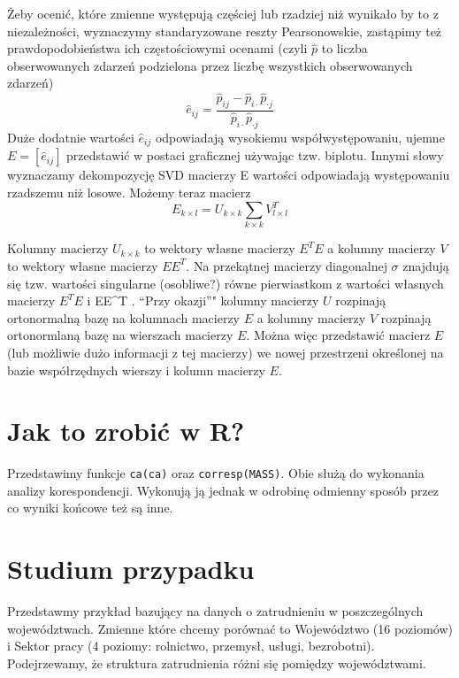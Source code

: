 \documentclass[polish,]{book}
\begin{document}
Żeby ocenić, które zmienne występują częściej lub rzadziej niż wynikało by to
z niezależności, wyznaczymy standaryzowane reszty Pearsonowskie, zastąpimy też
prawdopodobieństwa ich częstościowymi ocenami (czyli \(\hat{p}\)
to liczba obserwowanych
zdarzeń podzielona przez liczbę wszystkich obserwowanych zdarzeń)
\[
\hat{e}_{ij}=\frac{\hat{p}_{ij}-\hat{p}_{i\cdot}\hat{p}_{\cdot j}}{\hat{p}_{i\cdot}\hat{p}_{\cdot j}}
\]
Duże dodatnie wartości \(\hat{e}_{ij}\) odpowiadają wysokiemu współwystępowaniu, ujemne \(E=[\hat{e}_{ij}]\) przedstawić w postaci graficznej używając tzw. biplotu. Innymi słowy wyznaczamy dekompozycję SVD macierzy E
wartości odpowiadają występowaniu rzadszemu niż losowe. Możemy teraz macierz
\[
E_{k\times l}=U_{k\times k}\sum_{k\times k}V_{l \times l}^{T}
\]

Kolumny macierzy \(U_{k \times k}\) to wektory własne macierzy \(E^T E\) a kolumny macierzy \(V\)
to wektory własne macierzy \(EE^T\). Na przekątnej macierzy diagonalnej \(\sigma\) znajdują
się tzw. wartości singularne (osobliwe?) równe pierwiastkom z wartości własnych
macierzy \(E^TE\) i EE\^{}T . ``Przy okazji''" kolumny macierzy \(U\) rozpinają ortonormalną
bazę na kolumnach macierzy \(E\) a kolumny macierzy \(V\) rozpinają ortonormlaną bazę
na wierszach macierzy \(E\). Można więc przedstawić macierz \(E\) (lub możliwie dużo
informacji z tej macierzy) we nowej przestrzeni określonej na bazie współrzędnych
wierszy i kolumn macierzy \(E\).

\hypertarget{part_63}{%
\section{Jak to zrobić w R?}\label{part_63}}

Przedstawimy funkcje \texttt{ca(ca)} oraz \texttt{corresp(MASS)}. Obie służą do wykonania analizy
korespondencji. Wykonują ją jednak w odrobinę odmienny sposób przez co wyniki
końcowe też są inne.

\hypertarget{part_64}{%
\section{Studium przypadku}\label{part_64}}

Przedstawmy przykład bazujący na danych o zatrudnieniu w poszczególnych województwach. Zmienne które chcemy porównać to Województwo (16 poziomów) i
Sektor pracy (4 poziomy: rolnictwo, przemysł, usługi, bezrobotni). Podejrzewamy,
że struktura zatrudnienia różni się pomiędzy województwami.
\end{document}
